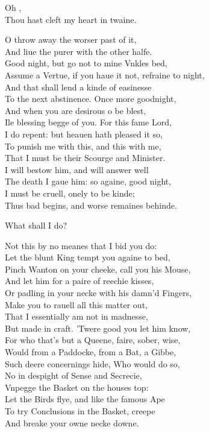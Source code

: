 \documentclass[a5paper,DIV=calc,11pt]{scrbook}
\begin{document}
\begin{drama*}
    \queenspeaks Oh \ham,\\
    Thou hast cleft my heart in twaine.
    
    \hamspeaks O throw away the worser past of it,\\
    And liue the purer with the other halfe.\\
    Good night, but go not to mine Vnkles bed,\\
    Assume a Vertue, if you haue it not, refraine to night,\\
    And that shall lend a kinde of easinesse\\
    To the next abstinence. Once more goodnight,\\
    And when you are desirous o be blest,\\
    Ile blessing begge of you. For this fame Lord,\\
    I do repent: but heauen hath pleased it so,\\
    To punish me with this, and this with me,\\
    That I must be their Scourge and Minister.\\
    I will bestow him, and will answer well\\
    The death I gaue him: so againe, good night,\\
    I must be cruell, onely to be kinde;\\
    Thus bad begins, and worse remaines behinde.
    
    \queenspeaks What shall I do?
    
    \hamspeaks Not this by no meanes that I bid you do:\\
    Let the blunt King tempt you againe to bed,\\
    Pinch Wanton on your cheeke, call you his Mouse,\\
    And let him for a paire of reechie kisses,\\
    Or padling in your necke with his damn'd Fingers,\\
    Make you to rauell all this matter out,\\
    That I essentially am not in madnesse,\\
    But made in craft. 'Twere good you let him know,\\
    For who that's but a Queene, faire, sober, wise,\\
    Would from a Paddocke, from a Bat, a Gibbe,\\
    Such deere concernings hide, Who would do so,\\
    No in despight of Sense and Secrecie,\\
    Vnpegge the Basket on the houses top:\\
    Let the Birds flye, and like the famous Ape\\
    To try Conclusions in the Basket, creepe\\
    And breake your owne necke downe.
    

\end{drama*}
\end{document}

